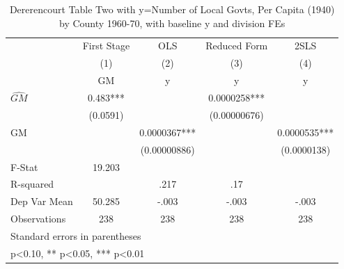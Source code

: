 \begin{table}[htbp]\centering
\def\sym#1{\ifmmode^{#1}\else\(^{#1}\)\fi}
\caption{Dererencourt Table Two with y=Number of Local Govts, Per Capita (1940) by County 1960-70, with baseline y and division FEs}
\begin{tabular}{l*{4}{c}}
\toprule
                    & First Stage   &         OLS   &Reduced Form   &        2SLS   \\
                    &\multicolumn{1}{c}{(1)}&\multicolumn{1}{c}{(2)}&\multicolumn{1}{c}{(3)}&\multicolumn{1}{c}{(4)}\\
                    &\multicolumn{1}{c}{GM}&\multicolumn{1}{c}{y}&\multicolumn{1}{c}{y}&\multicolumn{1}{c}{y}\\
\midrule
$\hat{GM}$          &       0.483***&               &   0.0000258***&               \\
                    &    (0.0591)   &               &(0.00000676)   &               \\
\addlinespace
GM                  &               &   0.0000367***&               &   0.0000535***\\
                    &               &(0.00000886)   &               & (0.0000138)   \\
\midrule
F-Stat              &      19.203   &               &               &               \\
R-squared           &               &        .217   &         .17   &               \\
Dep Var Mean        &      50.285   &       -.003   &       -.003   &       -.003   \\
Observations        &         238   &         238   &         238   &         238   \\
\bottomrule
\multicolumn{5}{l}{\footnotesize Standard errors in parentheses}\\
\multicolumn{5}{l}{\footnotesize * p<0.10, ** p<0.05, *** p<0.01}\\
\end{tabular}
\end{table}

